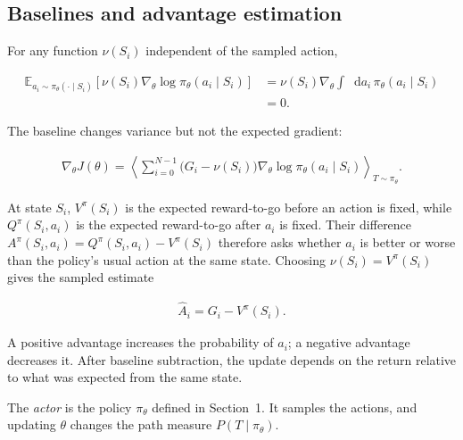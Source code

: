 \documentclass[11pt]{article}
\newcommand{\E}{\mathbb{E}}
\newcommand{\dd}{\mathop{}\!\mathrm{d}}
\begin{document}
\subsection{Baselines and advantage estimation}

For any function \(\nu(S_i)\) independent of the sampled action,

\begin{equation}
    \begin{split}
    \E_{a_i\sim\pi_\theta(\cdot\mid S_i)}
    \left[
      \nu(S_i)\nabla_\theta\log\pi_\theta(a_i\mid S_i)
    \right]
    &=\nu(S_i)\nabla_\theta
      \int\dd a_i\,\pi_\theta(a_i\mid S_i)\\
    &=0.
    \end{split}
    \label{eq:baseline-zero}
\end{equation}

The baseline changes variance but not the expected gradient:

\begin{equation}
    \begin{split}
    \nabla_\theta J(\theta)
      =\left\langle
       \sum_{i=0}^{N-1}
       \bigl(G_i-\nu(S_i)\bigr)
       \nabla_\theta\log\pi_\theta(a_i\mid S_i)
       \right\rangle_{T\sim\pi_\theta}.
    \end{split}
    \label{eq:baseline-policy-gradient}
\end{equation}

At state \(S_i\), \(V^\pi(S_i)\) is the expected reward-to-go before an
action is fixed, while \(Q^\pi(S_i,a_i)\) is the expected reward-to-go after
\(a_i\) is fixed.  Their difference
\(A^\pi(S_i,a_i)=Q^\pi(S_i,a_i)-V^\pi(S_i)\) therefore asks whether \(a_i\)
is better or worse than the policy's usual action at the same state.
Choosing \(\nu(S_i)=V^\pi(S_i)\) gives the sampled estimate

\begin{equation}
    \begin{split}
        \widehat A_i=G_i-V^\pi(S_i).
    \end{split}
\end{equation}

A positive advantage increases the probability of \(a_i\); a negative
advantage decreases it.  After baseline subtraction, the update depends on
the return relative to what was expected from the same state.

The \emph{actor} is the policy \(\pi_\theta\) defined in Section~1.  It samples
the actions, and updating \(\theta\) changes the path measure
\(P(T\mid\pi_\theta)\).
\end{document}
